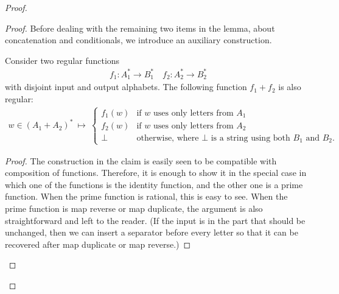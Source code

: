 \begin{proof}
\begin{proof}
        Before dealing with the remaining two items in the lemma, about concatenation and conditionals, we introduce an auxiliary construction.
    
        \begin{claim}\label{claim:conditional}
            Consider two regular functions 
            \begin{align*}
            f_1 : A_1^* \to B_1^* \quad f_2 : A_2^* \to B_2^*
            \end{align*}
            with disjoint input and output alphabets. The following function $f_1 + f_2$ is also regular:
                    \begin{align*}
        w \in (A_1 + A_2)^* 
        \  \mapsto \ 
        \begin{cases}
            f_1(w) & \text{if $w$ uses only letters from $A_1$}\\
            f_2(w) & \text{if $w$ uses only letters from $A_2$}\\
            \bot & \text{otherwise, where $\bot$ is a string using both $B_1$ and $B_2$.}
        \end{cases}
        \end{align*}
        \end{claim}

        \begin{proof}
            The construction in the claim is easily seen to be compatible with composition of functions. Therefore, it is enough to show it in the special case in which one of the functions is the identity function, and the other one is a prime function. When the prime function is rational, this is easy to see. When the prime function is map reverse or map duplicate, the argument is also straightforward and left to the reader.  (If the input is in the part that should be unchanged, then we can insert a separator before every letter so that it can be recovered after map duplicate or map reverse.)
        \end{proof}


\end{proof}
\end{proof}
